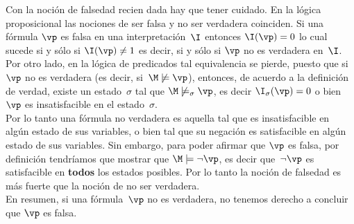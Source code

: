 \documentclass[11pt,letterpaper]{article}
\begin{document}
Con la noción de falsedad recien dada hay que tener cuidado. En la lógica
proposicional las nociones de ser falsa y no ser verdadera coinciden.  Si una 
fórmula $\vp$ es falsa en una interpretación~$\I$ entonces $\I(\vp)=0$ lo 
cual sucede si y sólo si $\I(\vp)\neq 1$ es decir, si y sólo si $\vp$ no es 
verdadera en~$\I$. \\
Por otro lado, en la lógica de predicados tal equivalencia se pierde, puesto que 
si $\vp$ no es verdadera (es decir, si~$\M\not\models\vp$), entonces, de 
acuerdo a la definición de verdad, existe un estado~$\sigma$ tal que 
$\M\not\models_\sigma\vp$, es decir $\I_\sigma(\vp)=0$ o bien $\vp$ es 
insatisfacible en el estado~$\sigma$.\\
Por lo tanto una fórmula no verdadera es  aquella tal que es insatisfacible en 
algún estado de sus variables, o bien tal que su negación es satisfacible en 
algún estado de sus variables. Sin embargo, para poder afirmar que  $\vp$ es 
falsa, por definición tendríamos que mostrar que $\M\models\neg\vp$, es decir 
que~$\neg\vp$ es satisfacible en \textbf{todos} los estados posibles. Por lo 
tanto la noción de falsedad es más fuerte que la noción de no ser verdadera.\\
En resumen, si una fórmula~$\vp$ no es verdadera, no tenemos derecho a concluir 
que $\vp$ es falsa.


\end{document}

